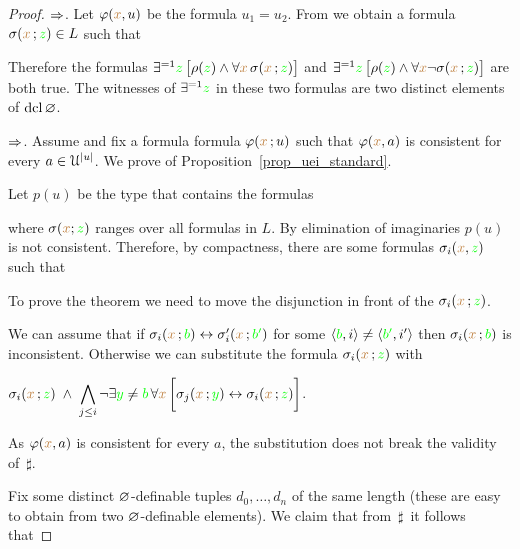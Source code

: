 \documentclass[creche.tex]{subfiles}
\begin{document}
\begin{proof}$\Rightarrow$. Let $\varphi({\color{brown} x},u)$ be the formula $u_1=u_2$. From  we obtain a formula $\sigma({\color{brown} x}\,;{\color{green} z})\in L$ such that 


Therefore the formulas $\exists^{=1} {\color{green} z}\,\big[\rho({\color{green} z})\wedge\forall {\color{brown}x}\,\sigma({\color{brown} x}\,;{\color{green} z})\big]$ and $\exists^{=1} {\color{green} z}\,\big[\rho({\color{green} z})\wedge\forall {\color{brown}x}\neg\sigma({\color{brown} x}\,;{\color{green} z})\big]$ are both true. The witnesses of $\exists^{=1} {\color{green} z}$ in these two formulas are two distinct elements of $\mathop{\rm dcl}\varnothing$.

$\Rightarrow$. Assume  and fix a formula formula $\varphi({\color{brown} x}\,;u)$ such that $\varphi({\color{brown} x},a)$ is consistent for every $a\in\EuScript U^{|u|}$. We prove  of Proposition~\ref{prop_uei_standard}.

Let $p(u)$ be the type that contains the formulas


where $\sigma({\color{brown} x};{\color{green} z})$ ranges over all formulas in $L$. By elimination of imaginaries $p(u)$ is not consistent. Therefore, by compactness, there are some formulas $\sigma_i({\color{brown} x},{\color{green} z})$ such that


To prove the theorem we need to move the disjunction in front of the $\sigma_i({\color{brown} x}\,;{\color{green} z})$. 

We can assume that if  $\sigma_i({\color{brown} x}\,;{\color{green} b})\leftrightarrow\sigma_i'({\color{brown} x}\,;{\color{green} b'})$ for some $\langle{\color{green}b},i\rangle\neq\langle{\color{green}b'},i'\rangle$ then $\sigma_i({\color{brown} x}\,;{\color{green} b})$ is inconsistent. Otherwise we can substitute the formula $\sigma_i({\color{brown} x}\,;{\color{green} z})$ with  


\hfil$\displaystyle\sigma_i({\color{brown} x}\,;{\color{green} z}) \;\wedge\; \bigwedge_{j\le i}\neg\exists{\color{green}y}\neq{\color{green}b}\,\forall {\color{brown}x}\,\bigg[\sigma_j({\color{brown} x}\,;{\color{green} y})\leftrightarrow\sigma_i({\color{brown} x}\,;{\color{green} z})\bigg]$.


As $\varphi({\color{brown} x},a)$ is consistent for every $a$, the substitution does not break the validity of $\,\sharp$.

Fix some distinct $\varnothing$-definable tuples $d_0,\dots, d_n$ of the same length (these are easy to obtain from two $\varnothing$-definable elements). We claim that from $\,\sharp\,$ it follows that


\end{proof}
\end{document}
